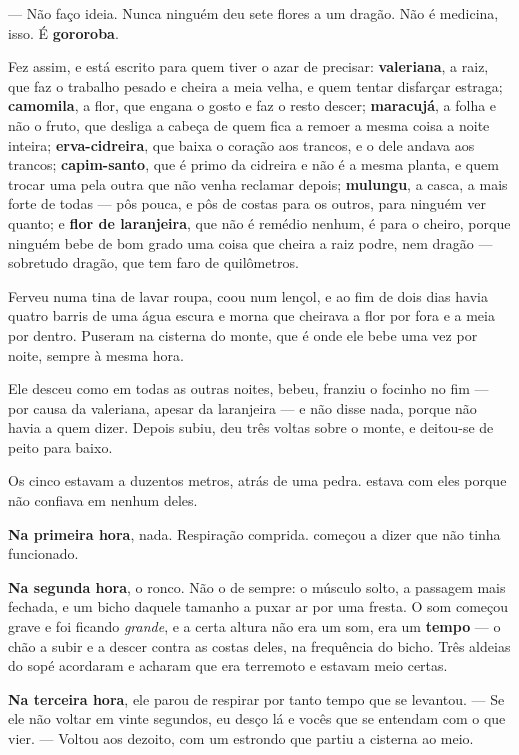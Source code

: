 \documentclass[livro.tex]{subfiles}
\begin{document}
--- Não faço ideia. Nunca ninguém deu sete flores a um dragão. Não é medicina, isso. É
\textbf{gororoba}.

\medskip

Fez assim, e está escrito para quem tiver o azar de precisar: \textbf{valeriana}, a raiz, que faz
o trabalho pesado e cheira a meia velha, e quem tentar disfarçar estraga; \textbf{camomila}, a
flor, que engana o gosto e faz o resto descer; \textbf{maracujá}, a folha e não o fruto, que
desliga a cabeça de quem fica a remoer a mesma coisa a noite inteira; \textbf{erva-cidreira}, que
baixa o coração aos trancos, e o dele andava aos trancos; \textbf{capim-santo}, que é primo da
cidreira e não é a mesma planta, e quem trocar uma pela outra que não venha reclamar depois;
\textbf{mulungu}, a casca, a mais forte de todas --- \Qui pôs pouca, e pôs de costas para os
outros, para ninguém ver quanto; e \textbf{flor de laranjeira}, que não é remédio nenhum, é para
o cheiro, porque ninguém bebe de bom grado uma coisa que cheira a raiz podre, nem dragão ---
sobretudo dragão, que tem faro de quilômetros.

Ferveu numa tina de lavar roupa, coou num lençol, e ao fim de dois dias havia quatro barris de
uma água escura e morna que cheirava a flor por fora e a meia por dentro. Puseram na cisterna do
monte, que é onde ele bebe uma vez por noite, sempre à mesma hora.

\medskip

Ele desceu como em todas as outras noites, bebeu, franziu o focinho no fim --- por causa da
valeriana, apesar da laranjeira --- e não disse nada, porque não havia a quem dizer. Depois
subiu, deu três voltas sobre o monte, e deitou-se de peito para baixo.

Os cinco estavam a duzentos metros, atrás de uma pedra. \Qui estava com eles porque não confiava
em nenhum deles.

\medskip

\textbf{Na primeira hora}, nada. Respiração comprida. \Yas começou a dizer que não tinha
funcionado.

\textbf{Na segunda hora}, o ronco. Não o de sempre: o músculo solto, a passagem mais fechada, e
um bicho daquele tamanho a puxar ar por uma fresta. O som começou grave e foi ficando
\emph{grande}, e a certa altura não era um som, era um \textbf{tempo} --- o chão a subir e a
descer contra as costas deles, na frequência do bicho. Três aldeias do sopé acordaram e acharam
que era terremoto e estavam meio certas.

\textbf{Na terceira hora}, ele parou de respirar por tanto tempo que \Qui se levantou. --- Se ele
não voltar em vinte segundos, eu desço lá e vocês que se entendam com o que vier. --- Voltou aos
dezoito, com um estrondo que partiu a cisterna ao meio.
\end{document}
